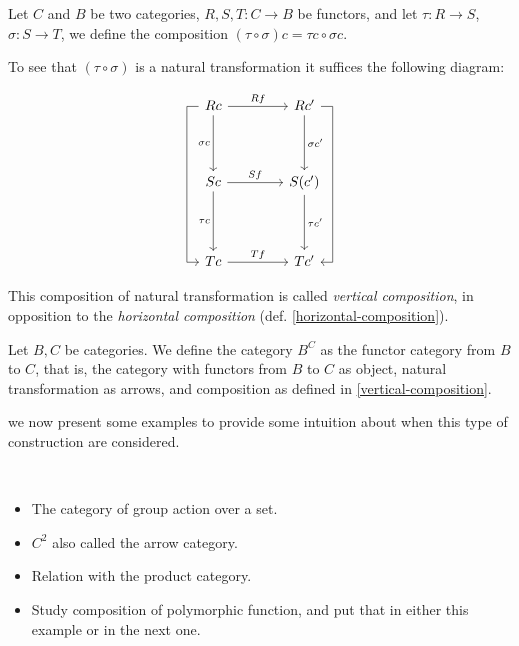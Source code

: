\begin{definition}\label{vertical-composition}
Let $C$ and $B$ be two categories, $R,S,T : C \to B$ be functors, and let $\tau: R \to S$, $\sigma:S\to T$, we define the composition $(\tau \circ \sigma)c = \tau c\circ \sigma c$.
\end{definition}

To see that $(\tau \circ \sigma)$ is a natural transformation it suffices the following diagram\cite{stack-composition-natural}:

$$
\begin{tikzcd}[row sep = 1.4cm, column sep = 1.4cm]
  R c
  \arrow[lddr, to path= { --
    ([xshift=-1ex]\tikztostart.west)
    -| ([xshift=-2ex]\tikztotarget.west)
    |- (\tikztotarget)}]
  \arrow[d, swap, "\sigma c"]
  \arrow[r, "R f"] 
  & R c'
  \arrow[d, "\sigma c'"]
  \arrow[rddl, to path= { --
    ([xshift=1ex]\tikztostart.east) 
    -| ([xshift=2ex]\tikztotarget.east)
    -- (\tikztotarget)}, "\sigma \circ \tau c'"]
  \\
  S c
  \arrow[d, swap, "\tau c "] 
  \arrow[r, "S f "] & S(c')
  \arrow[d, "\tau c'"] \\
  T c 
  \arrow[r, "T f"] & T c'
\end{tikzcd}
$$

This composition of natural transformation is called \emph{vertical composition}, in opposition to the \emph{horizontal composition} (def. \ref{horizontal-composition}).

\begin{definition}
  Let $B,C$ be categories. We define the category $B^C$ as the functor category from $B$ to $C$, that is, the category with functors from $B$ to $C$ as object, natural transformation as arrows, and composition as defined in \ref{vertical-composition}.
\end{definition}

we now present some examples to provide some intuition about when this type of construction are considered.

\begin{example}\ 
  \begin{itemize}
  \item The category of group action over a set.
  \item $C^2$ also called the arrow category.
  \item Relation with the product category.
  \item Study composition of polymorphic function, and put that in either this example or in the next one.
  \end{itemize}
\end{example}

